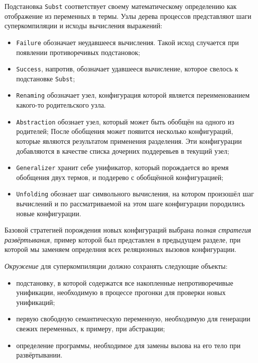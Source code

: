 Подстановка \lstinline{Subst} соответствует своему математическому определению как отображение из
переменных в термы.
Узлы дерева процессов представляют шаги суперкомпиляции и исходы вычисления выражений:
\begin{itemize}
\item \lstinline{Failure} обозначает неудавшееся вычисления. Такой исход
      случается при появлении противоречивых подстановок;
\item \lstinline{Success}, напротив, обозначает удавшееся вычисление, которое свелось к подстановке \lstinline{Subst};
\item \lstinline{Renaming} обозначает узел, конфигурация которой является переименованием какого-то родительского узла.
\item \lstinline{Abstraction} обознает узел, который может быть обобщён на одного из родителей;
      После обобщения может появится несколько конфигураций, которые являются результатом применения разделения.
      Эти конфигурации добавляются в качестве списка дочерних поддеревьев в текущий узел;
\item \lstinline{Generalizer} хранит себе унификатор, который порождается во время обобщения
      двух термов, и поддерево с обобщённой конфигурацией;
\item \lstinline{Unfolding} обознает шаг символьного вычисления, на котором произошёл шаг вычислений
      и по рассматриваемой на этом шаге конфигурации породились новые конфигурации.
\end{itemize}

Базовой стратегией порождения новых конфигураций выбрана \emph{полная стратегия развёртывания},
пример которой был представлен в предыдущем разделе, при которой мы заменяем определния всех реляционных вызовов
конфигурации.



\emph{Окружение} для суперкомпиляции должно сохранять следующие объекты:
\begin{itemize}
\item подстановку, в которой содержатся все накопленные непротиворечивые унификации,
      необходимую в процессе прогонки для проверки новых унификаций;
\item первую свободную семантическую переменную, необходимую для генерации свежих переменных,
      к примеру, при абстракции;
\item определение программы, необходимое для замены вызова на его тело при развёртывании.
\end{itemize}

